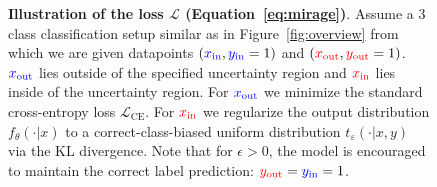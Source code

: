 \begin{figure}
{
    }
    \caption[Illustration of the \attack loss $\mathcal{L}$ (Equation~\ref{eq:mirage}).]{\textbf{Illustration of the \attack loss $\mathcal{L}$ (Equation~\ref{eq:mirage})}. Assume a 3 class classification setup similar as in Figure~\ref{fig:overview} from which we are given datapoints $(\textcolor{blue}{x_\text{in}}, \textcolor{blue}{y_\text{in}}=1)$ and $(\textcolor{red}{x_\text{out}}, \textcolor{red}{y_\text{out}}=1)$. $\textcolor{blue}{x_\text{out}}$ lies outside of the specified uncertainty region and $\textcolor{red}{x_\text{in}}$ lies inside of the uncertainty region. For $\textcolor{blue}{x_\text{out}}$ we minimize the standard cross-entropy loss $\mathcal{L}_\text{CE}$. For $\textcolor{red}{x_\text{in}}$ we regularize the output distribution $f_\theta(\cdot|x)$ to a correct-class-biased uniform distribution $t_\varepsilon(\cdot|x,y)$ via the KL divergence. Note that for $\epsilon > 0$, the model is encouraged to maintain the correct label prediction: $\textcolor{red}{y_\text{out}} = \textcolor{blue}{y_\text{in}} = 1$.}
    \label{fig:losses}
\end{figure}

